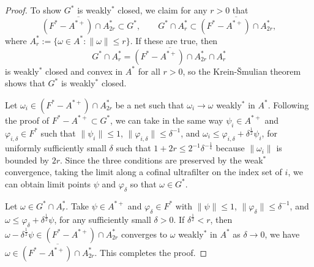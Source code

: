 \documentclass[10pt,a4paper]{amsart}
\begin{document}
\begin{proof}
To show $G^*$ is weakly$^*$ closed, we claim for any $r>0$ that 
\[\overline{(F^*-A^{*+})\cap A_{2r}^*}\subset G^*,\qquad G^*\cap A_r^*\subset\overline{(F^*-A^{*+})\cap A_{2r}^*},\]
where $A_r^*:=\{\omega\in A^*:\|\omega\|\le r\}$.
If these are true, then
\[G^*\cap A_r^*=\overline{(F^*-A^{*+})\cap A_{2r}^*}\cap A_r^*\]
is weakly$^*$ closed and convex in $A^*$ for all $r>0$, so the Krein-\v Smulian theorem shows that $G^*$ is weakly$^*$ closed.

Let $\omega_i\in(F^*-A^{*+})\cap A_{2r}^*$ be a net such that $\omega_i\to\omega$ weakly$^*$ in $A^*$.
Following the proof of $F^*-A^{*+}\subset G^*$, we can take in the same way $\psi_i\in A^{*+}$ and $\varphi_{i,\delta}\in F^*$ such that $\|\psi_i\|\le1$, $\|\varphi_{i,\delta}\|\le\delta^{-1}$, and $\omega_i\le\varphi_{i,\delta}+\delta^{\frac12}\psi_i$, for uniformly sufficiently small $\delta$ such that $1+2r\le2^{-1}\delta^{-\frac14}$ because $\|\omega_i\|$ is bounded by $2r$.
Since the three conditions are preserved by the weak$^*$ convergence, taking the limit along a cofinal ultrafilter on the index set of $i$, we can obtain limit points $\psi$ and $\varphi_\delta$ so that $\omega\in G^*$.

Let $\omega\in G^*\cap A_r^*$.
Take $\psi\in A^{*+}$ and $\varphi_\delta\in F^*$ with $\|\psi\|\le1$, $\|\varphi_\delta\|\le\delta^{-1}$, and $\omega\le\varphi_\delta+\delta^{\frac12}\psi$, for any sufficiently small $\delta>0$.
If $\delta^{\frac12}<r$, then $\omega-\delta^{\frac12}\psi\in(F^*-A^{*+})\cap A_{2r}^*$ converges to $\omega$ weakly$^*$ in $A^*$ as $\delta\to0$, we have $\omega\in\overline{(F^*-A^{*+})\cap A_{2r}^*}$.
This completes the proof.
\end{proof}
\end{document}
